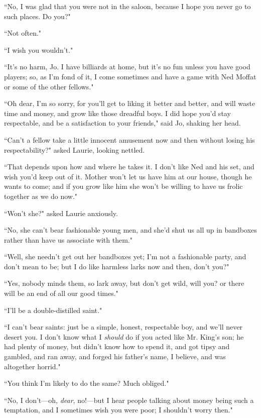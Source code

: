 ``No, I was glad that you were not in the saloon, because I hope you
never go to such places. Do you?"

``Not often."

``I wish you wouldn't."

``It's no harm, Jo. I have billiards at home, but
it's no fun unless you have good players; so, as
I'm fond of it, I come sometimes and have a game with
Ned Moffat or some of the other fellows."

``Oh dear, I'm so sorry, for you'll get
to liking it better and better, and will waste time and money, and grow
like those dreadful boys. I did hope you'd stay
respectable, and be a satisfaction to your friends," said Jo, shaking
her head.

``Can't a fellow take a little innocent amusement now and
then without losing his respectability?" asked Laurie, looking nettled.

``That depends upon how and where he takes it. I don't
like Ned and his set, and wish you'd keep out of it.
Mother won't let us have him at our house, though he
wants to come; and if you grow like him she won't be
willing to have us frolic together as we do now."

``Won't she?" asked Laurie anxiously.

``No, she can't bear fashionable young men, and
she'd shut us all up in bandboxes rather than have us
associate with them."

``Well, she needn't get out her bandboxes yet;
I'm not a fashionable party, and don't
mean to be; but I do like harmless larks now and then,
don't you?"

``Yes, nobody minds them, so lark away, but don't get
wild, will you? or there will be an end of all our good times."

``I'll be a double-distilled saint."

``I can't bear saints: just be a simple, honest,
respectable boy, and we'll never desert you. I
don't know what I \emph{should} do if you acted like Mr.
King's son; he had plenty of money, but
didn't know how to spend it, and got tipsy and gambled,
and ran away, and forged his father's name, I believe,
and was altogether horrid."

``You think I'm likely to do the same? Much obliged."

``No, I don't---oh, \emph{dear}, no!---but I hear people
talking about money being such a temptation, and I sometimes wish you
were poor; I shouldn't worry then."

